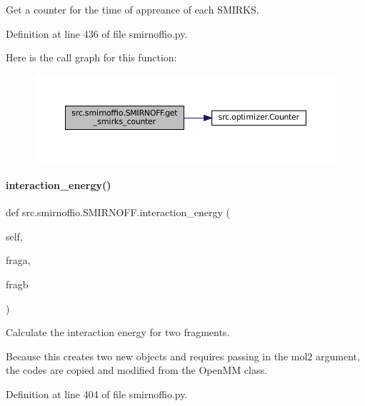 Get a counter for the time of appreance of each S\+M\+I\+R\+KS. 



Definition at line 436 of file smirnoffio.\+py.

Here is the call graph for this function\+:
\nopagebreak
\begin{figure}[H]
\begin{center}
\leavevmode
\includegraphics[width=350pt]{classsrc_1_1smirnoffio_1_1SMIRNOFF_a328bfae882bfe603e397ebe74a2455e9_cgraph}
\end{center}
\end{figure}
\mbox{\label{classsrc_1_1smirnoffio_1_1SMIRNOFF_a64a07cbc61134660c4c6d97337b1e785}} 
\paragraph{\texorpdfstring{interaction\+\_\+energy()}{interaction\_energy()}}
{\footnotesize\ttfamily def src.\+smirnoffio.\+S\+M\+I\+R\+N\+O\+F\+F.\+interaction\+\_\+energy (\begin{DoxyParamCaption}\item[{}]{self,  }\item[{}]{fraga,  }\item[{}]{fragb }\end{DoxyParamCaption})}



Calculate the interaction energy for two fragments. 

Because this creates two new objects and requires passing in the mol2 argument, the codes are copied and modified from the Open\+MM class. 

Definition at line 404 of file smirnoffio.\+py.

